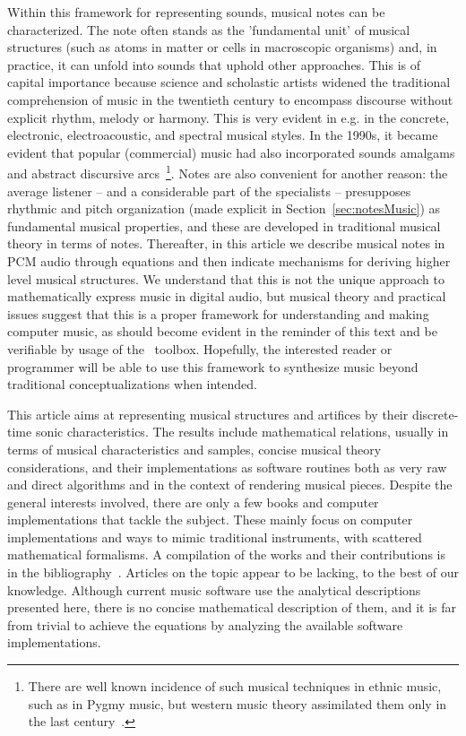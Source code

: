 Within this framework for representing sounds,
musical notes can be characterized.
The note often stands as the 'fundamental unit' of musical structures
(such as atoms in matter or cells in macroscopic organisms) and,
in practice, it can unfold into sounds that uphold other approaches.
This is of capital importance because science and scholastic artists
widened the traditional comprehension of music in the twentieth century
to encompass discourse without explicit rhythm, melody or harmony.
This is very evident in e.g. in the concrete, electronic, electroacoustic,
and spectral musical styles.
In the 1990s, it became evident that popular
(commercial) music had also incorporated
sounds amalgams and abstract discursive arcs~\footnote{There
are well known incidence of such musical techniques in ethnic music,
such as in Pygmy music, but western music theory assimilated them
only in the last century~\cite{Wisnick}.}.
Notes are also convenient for another reason:
the average listener -- and a considerable part of the specialists --
presupposes rhythmic and pitch organization 
(made explicit in Section~\ref{sec:notesMusic})
as fundamental musical properties,
and these are developed in traditional musical theory in terms of notes.
Thereafter, in this article we describe musical notes in PCM audio through equations
and then indicate mechanisms for deriving higher level musical structures.
We understand that this is not the unique approach to mathematically express music in
digital audio, but musical theory and practical issues suggest that
this is a proper framework for understanding and making computer music,
as should become evident in the reminder of this text and be verifiable
by usage of the \massa\ toolbox.
Hopefully, the interested reader or programmer will be able to use
this framework to synthesize music beyond traditional conceptualizations when intended.

This article aims at representing musical structures and artifices
by their discrete-time sonic characteristics.
The results include mathematical relations,
usually in terms of musical characteristics and samples,
concise musical theory considerations,
and their implementations as software routines both as
very raw and direct algorithms and in the context of rendering musical pieces.
Despite the general interests involved,
there are only a few books and computer implementations that tackle the subject.
These mainly focus on computer implementations and ways to mimic traditional instruments,
with scattered mathematical formalisms.
A compilation of the works and their contributions is in the bibliography~\cite{dissertacao}.
Articles on the topic appear to be lacking, to the best of our knowledge.
Although current music software use the analytical descriptions presented here,
there is no concise mathematical description of them, and it is far from trivial
to achieve the equations by analyzing the available software implementations.

